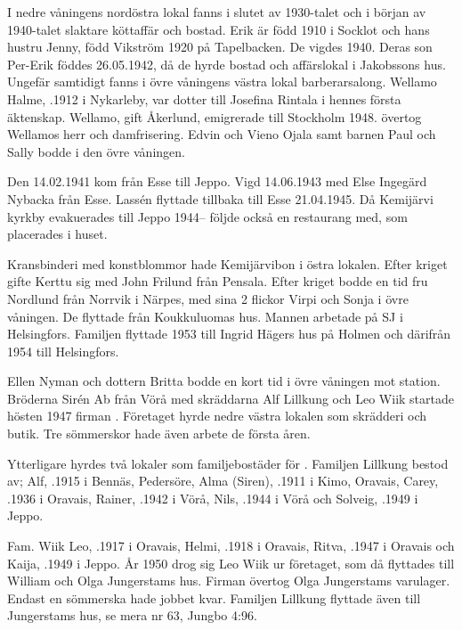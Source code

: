 
I nedre våningens nordöstra lokal fanns i slutet av 1930-talet och i början av 1940-talet slaktare  köttaffär och bostad. Erik är född 1910 i Socklot och hans hustru Jenny, född Vikström 1920 på Tapelbacken. De vigdes 1940. Deras son Per-Erik föddes 26.05.1942, då de hyrde bostad och affärslokal i Jakobssons hus. Ungefär samtidigt fanns i övre våningens västra lokal  barberarsalong. Wellamo Halme, .1912 i Nykarleby, var dotter till Josefina Rintala i hennes första äktenskap. Wellamo, gift Åkerlund, emigrerade till Stockholm 1948.  övertog Wellamos herr och damfrisering. Edvin och Vieno Ojala samt barnen Paul och Sally bodde i den övre våningen.

Den 14.02.1941 kom  från Esse till Jeppo. Vigd 14.06.1943 med Else Ingegärd Nybacka från Esse. Lassén flyttade tillbaka till Esse 21.04.1945. Då Kemijärvi kyrkby evakuerades till Jeppo 1944-- följde också en restaurang  med, som placerades i huset.

Kransbinderi med konstblommor hade Kemijärvibon  i östra lokalen. Efter kriget gifte Kerttu sig med John Frilund från Pensala. Efter kriget bodde en tid fru Nordlund från Norrvik i Närpes, med sina 2 flickor Virpi och Sonja i övre våningen. De flyttade från Koukkuluomas hus. Mannen arbetade på SJ i Helsingfors. Familjen flyttade 1953 till Ingrid Hägers hus på Holmen och därifrån 1954 till Helsingfors.

Ellen Nyman och dottern Britta bodde en kort tid i övre våningen mot station. Bröderna Sirén Ab från Vörå med skräddarna Alf Lillkung och Leo Wiik startade hösten 1947 firman . Företaget hyrde nedre västra lokalen som skrädderi och butik. Tre sömmerskor hade även arbete de första åren.

Ytterligare hyrdes två lokaler som familjebostäder för . Familjen Lillkung bestod av; Alf, .1915 i Bennäs, Pedersöre,	Alma (Siren), .1911 i Kimo, Oravais,	Carey, .1936 i Oravais, Rainer,	.1942 i Vörå, Nils,	.1944 i Vörå	och	Solveig,	.1949 i Jeppo.

Fam. Wiik	Leo, .1917 i Oravais, Helmi,	.1918 i Oravais,	Ritva, .1947 i Oravais och Kaija, .1949 i Jeppo. År 1950 drog sig Leo Wiik ur företaget, som då flyttades till William och Olga Jungerstams hus. Firman övertog Olga Jungerstams varulager. Endast en sömmerska hade jobbet kvar. Familjen Lillkung flyttade även till Jungerstams hus, se mera nr 63, Jungbo 4:96.

